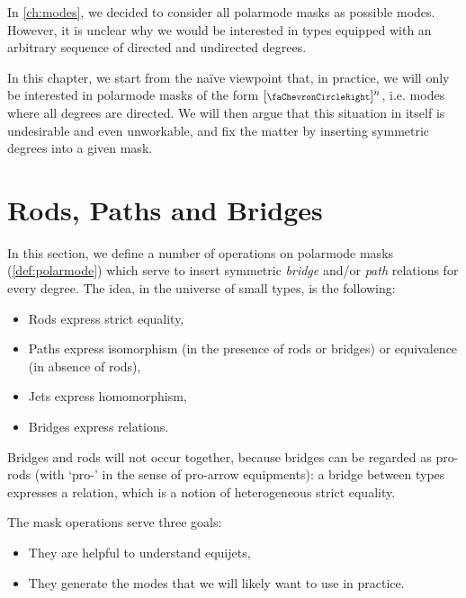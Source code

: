 \documentclass[a4paper]{memoir}
\begin{document}
In \cref{ch:modes}, we decided to consider all polarmode masks as possible modes.
However, it is unclear why we would be interested in types equipped with an arbitrary sequence of directed and undirected degrees.

In this chapter, we start from the na\"ive viewpoint that, in practice, we will only be interested in polarmode masks of the form $[\ypolar]^n$, i.e. modes where all degrees are directed.
We will then argue that this situation in itself is undesirable and even unworkable, and fix the matter by inserting symmetric degrees into a given mask.





\section{Rods, Paths and Bridges} \label{sec:pb}
In this section, we define a number of operations on polarmode masks (\cref{def:polarmode}) which serve to insert symmetric \emph{bridge} and/or \emph{path} relations for every degree.
The idea, in the universe of small types, is the following:
\begin{itemize}
	\item Rods express strict equality,
	\item Paths express isomorphism (in the presence of rods or bridges) or equivalence (in absence of rods),
	\item Jets express homomorphism,
	\item Bridges express relations.
\end{itemize}
Bridges and rods will not occur together, because bridges can be regarded as pro-rods (with `pro-' in the sense of pro-arrow equipments): a bridge between types expresses a relation, which is a notion of heterogeneous strict equality.

The mask operations serve three goals:
\begin{itemize}
	\item They are helpful to understand equijets,
	\item They generate the modes that we will likely want to use in practice.
\end{itemize}
\end{document}
